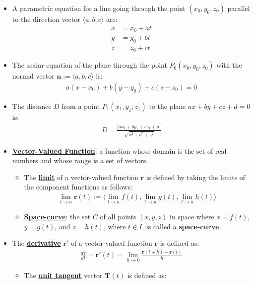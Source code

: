 \documentclass[11pt]{article}
\newcommand{\dfn}[1]{\underline{\textbf{#1}}}
\begin{document}
\begin{itemize}[noitemsep]
\begin{itemize}[noitemsep]
	\end{itemize}
	\item A parametric equation for a line going through the point $(x_0, y_0, z_0)$ parallel to the direction vector $\langle a, b, c \rangle $ are: 
	\begin{align*}
		x & = x_0 + at \\
		y & = y_0 + bt \\
		z & = z_0 + ct 
	\end{align*}
	\item The scalar equation of the plane through the point $P_0(x_0, y_0, z_0) $ with the normal vector $\mathbf{n} := \langle a, b, c \rangle$ is: 
	\begin{align}
		a(x-x_0) + b(y-y_0) + c(z-z_0) = 0 	
	\end{align}
	\item The distance $D$ from a point $P_1(x_1, y_1, z_1)$ to the plane $ax+ by + cz + d =0$ is: 
	\begin{align}
		D = \frac{|ax_1 + by_1 + cz_1 + d |}{\sqrt{a^2 + b^2 + z^2}}	
	\end{align}
	\item \dfn{Vector-Valued Function}: a function whose domain is the set of real numbers and whose range is a set of vectors. 
	\begin{itemize}[noitemsep]
		\item The \dfn{limit} of a vector-valued function $\mathbf{r}$ is defined by taking the limits of the component functions as follows: 
		\begin{align}
			\lim_{ t \rightarrow a} \mathbf{r}(t) := \langle \lim_{t \rightarrow a} f(t), 	\lim_{t \rightarrow a} g(t), \lim_{t \rightarrow a} h(t) \rangle 
		\end{align}
	\item \dfn{Space-curve}: the set $C$ of all points $(x,y,z)$ in space where $x= f(t)$, $y=g(t)$, and $z = h(t)$, where $t \in I$, is called a \dfn{space-curve}. 
	\end{itemize}
	\item The \dfn{derivative} $\mathbf{r}'$ of a vector-valued function $\mathbf{r}$ is defined as: 
	\begin{align}
		\frac{d \mathbf{r}}{dt} = \mathbf{r}'(t) = \lim_{h \rightarrow 0} \frac{\mathbf{r}(t+h) - \mathbf{r}(t)}{h}	
	\end{align}
	\begin{itemize}
		\item The \dfn{unit tangent} vector $\mathbf{T}(t)$ is defined as:
		\begin{align}

\end{align}
\end{itemize}
\end{itemize}
\end{document}

